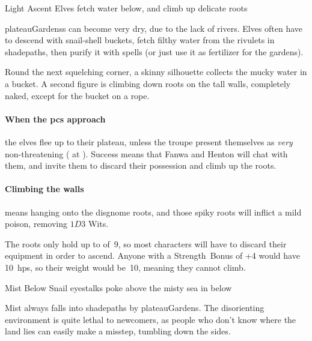 
{Light Ascent}%
{Elves fetch water below, and climb up delicate roots}%
\label{shadeAscent}

\Glspl{plateauGardens} can become very dry, due to the lack of rivers.
Elves often have to descend with snail-shell buckets, fetch filthy water from the rivulets in \gls{shadepaths}, then purify it with spells (or just use it as fertilizer for the gardens).

\begin{boxtext}
  Round the next squelching corner, a skinny silhouette collects the mucky water in a bucket.
  A second figure is climbing down roots on the tall walls, completely naked, except for the bucket on a rope.
\end{boxtext}

\paragraph{When the \glspl{pc} approach}
the elves flee up to their plateau, unless the troupe present themselves as \emph{very} non-threatening ( at \tn[10]).
Success means that Fanwa and Henton will chat with them, and invite them to discard their possession and climb up the roots.

\paragraph{Climbing the walls}
means hanging onto the \gls{disgnome} roots, and those spiky roots will inflict a mild poison, removing $1D3$ Wits.

The roots only hold up to  of~9, so most characters will have to discard their equipment in order to ascend.
Anyone with a Strength~Bonus of +4 would have 10~\glspl{hp}, so their \gls{weight} would be~10, meaning they cannot climb.


\showStdSpells

{Mist Below}%
{Snail eyestalks poke above the misty sea in  below}%

Mist always falls into \gls{shadepaths} by \gls{plateauGardens}.
The disorienting environment is quite lethal to newcomers, as people who don't know where the land lies can easily make a misstep, tumbling down the sides.

